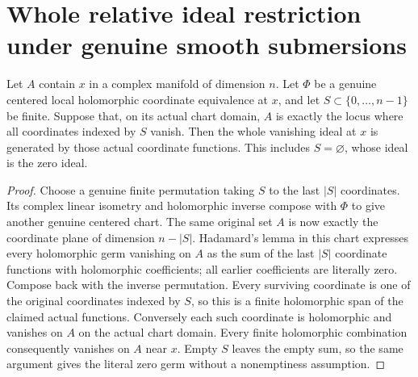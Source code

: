 \section{Whole relative ideal restriction under genuine smooth submersions}

\begin{theorem}
\label{hir:submersion-relative-coordinate-ideal}
Let $A$ contain $x$ in a complex manifold of dimension $n$. Let $\Phi$ be a
genuine centered local holomorphic coordinate equivalence at $x$, and let
$S\subset\{0,\ldots,n-1\}$ be finite. Suppose that, on its actual chart domain,
$A$ is exactly the locus where all coordinates indexed by $S$ vanish. Then the
whole vanishing ideal at $x$ is generated by those actual coordinate functions.
This includes $S=\varnothing$, whose ideal is the zero ideal.
\leanok
\begin{proof}
Choose a genuine finite permutation taking $S$ to the last $|S|$ coordinates.
Its complex linear isometry and holomorphic inverse compose with $\Phi$ to
give another genuine centered chart. The same original set $A$ is now exactly
the coordinate plane of dimension $n-|S|$. Hadamard's lemma in this chart
expresses every holomorphic germ vanishing on $A$ as the sum of the last
$|S|$ coordinate functions with holomorphic coefficients; all earlier
coefficients are literally zero. Compose back with the inverse permutation.
Every surviving coordinate is one of the original coordinates indexed by
$S$, so this is a finite holomorphic span of the claimed actual functions.
Conversely each such coordinate is holomorphic and vanishes on $A$ on the
actual chart domain. Every finite holomorphic combination consequently
vanishes on $A$ near $x$. Empty $S$ leaves the empty sum, so the same argument
gives the literal zero germ without a nonemptiness assumption.
\end{proof}
\end{theorem}

